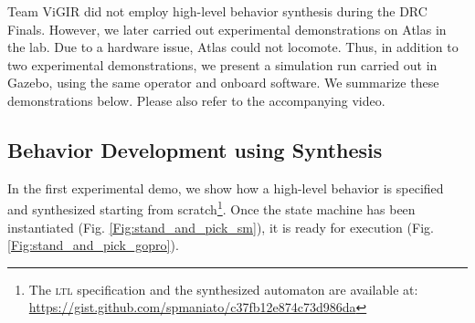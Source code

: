 

Team ViGIR did not employ high-level behavior synthesis during the DRC Finals.
However, we later carried out experimental demonstrations on Atlas in the lab.
Due to a hardware issue, Atlas could not locomote.
Thus, in addition to two experimental demonstrations, we present a simulation run carried out in Gazebo, using the same operator and onboard software.
We summarize these demonstrations below.
Please also refer to the accompanying video.

\subsection{Behavior Development using Synthesis}\label{S:SynthesisFromScratch}

In the first experimental demo, we show how a high-level behavior is specified and synthesized starting from scratch\footnote{The \textsc{ltl} specification and the synthesized automaton are available at: \scriptsize{\url{https://gist.github.com/spmaniato/c37fb12e874c73d986da}}}.
Once the state machine has been instantiated (Fig. \ref{Fig:stand_and_pick_sm}), it is ready for execution (Fig. \ref{Fig:stand_and_pick_gopro}).

